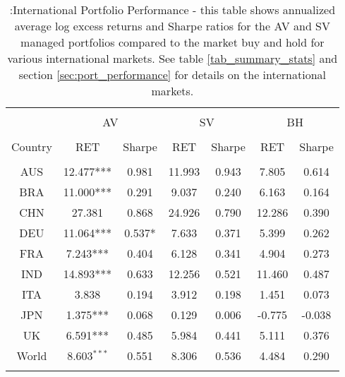 
\begin{table}[!htbp] \centering 
  \caption{:International Portfolio Performance - this table shows annualized average log excess returns and Sharpe ratios for the AV and SV managed portfolios compared to the market buy and hold for various international markets. See table \ref{tab_summary_stats} and section \ref{sec:port_performance} for details on the international markets.} 
  \label{tab:tab_intPerf1} 
\begin{tabular}{@{\extracolsep{5pt}} ccccccc} 
\\[-1.8ex]\hline 
\hline \\[-1.8ex]
& \multicolumn{2}{c}{AV} &\multicolumn{2}{c}{SV}& \multicolumn{2}{c}{BH}\\
\cline{2-3} \cline{4-5} \cline{6-7}\\
Country & RET & Sharpe & RET & Sharpe & RET & Sharpe \\ 
\hline \\[-1.8ex] 
AUS & 12.477*** & 0.981 & 11.993 & 0.943 & 7.805 & 0.614 \\ 
BRA & 11.000*** & 0.291 & 9.037 & 0.240 & 6.163 & 0.164 \\ 
CHN & 27.381 & 0.868 & 24.926 & 0.790 & 12.286 & 0.390 \\ 
DEU & 11.064*** & 0.537* & 7.633 & 0.371 & 5.399 & 0.262 \\ 
FRA & 7.243*** & 0.404 & 6.128 & 0.341 & 4.904 & 0.273 \\ 
IND & 14.893*** & 0.633 & 12.256 & 0.521 & 11.460 & 0.487 \\ 
ITA & 3.838 & 0.194 & 3.912 & 0.198 & 1.451 & 0.073 \\ 
JPN & 1.375*** & 0.068 & 0.129 & 0.006 & -0.775 & -0.038 \\ 
UK & 6.591*** & 0.485 & 5.984 & 0.441 & 5.111 & 0.376 \\ 
World & 8.603$^{***}$ & 0.551 &  8.306 & 0.536  & 4.484 & 0.290\\
\hline \\[-1.8ex] 
\end{tabular} 
\end{table} 
